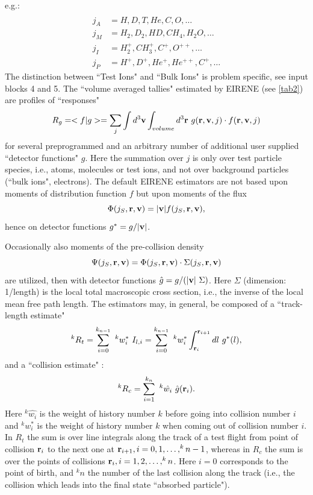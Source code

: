 e.g.:
\begin{align}
      &                                                  \\
  j_A & = H, D, T, He, C, O,  \dots \nonumber            \\
  j_M & = H_2, D_2,  HD, CH_4, H_2 O,  \dots \nonumber   \\
  j_I & = H_2^+, CH_3^+,  C^+, O^{++}, \dots  \nonumber  \\
  j_P & = H^+, D^+, He^+,  He^{++}, C^+, \dots \nonumber
\end{align}
The distinction between ``Test Ions" and ``Bulk Ions" is problem specific, see
input blocks 4 and 5.
The ``volume averaged tallies" estimated by EIRENE (see \cref{tab2}) are
profiles of ``responses"
\begin{displaymath}
  R_g = <	f | g	> = \sum_{j}
  \int d^3 \mathbf{v} \int_{volume} d^3 \mathbf{r} \ g(\mathbf{r}, \mathbf{v} , j)	 \cdot	   f(\mathbf{r}, \mathbf{v},
  j)\label{est}
\end{displaymath}
for several preprogrammed and an arbitrary
number of additional user supplied ``detector functions" $g$.
Here the summation over $j$ is only over test particle species, i.e., atoms,
molecules or test ions, and not over background particles (``bulk ions",
electrons).
The default EIRENE estimators are not based upon moments of distribution
function $f$ but upon moments of the flux
\begin{displaymath}
  \Phi ( j_S, \mathbf{r},
  \mathbf{v} ) = | \mathbf{v} |  f(j_S, \mathbf{r}, \mathbf{v}),
\end{displaymath}
hence on detector
functions $g^{*} = g / | \mathbf{v} | $.

Occasionally also moments of the pre-collision density
\begin{displaymath}
  \Psi
  ( j_S, \mathbf{r}, \mathbf{v} ) = \Phi ( j_S, \mathbf{r}, \mathbf{v} ) \cdot     \Sigma ( j_S, \mathbf{r}, \mathbf{v} )
\end{displaymath}
are utilized, then with detector functions $ \hat{g} = g / (|
  \mathbf{v} | \ \Sigma)  $.
Here $\Sigma$ (dimension: 1/length) is the local total macroscopic cross
section, i.e., the inverse of the local mean free path length.
The estimators may, in general, be composed of a ``track-length estimate"
\begin{equation}
  \label{tracklest} ^k{R_t} = \sum_{i=0}^{k_{n-1}}   \ ^k w_i^*
  \  I_{l,i} = \sum_{i=0}^{k_{n-1}} \ ^k w_i^* \int_{\mathbf{r}_i}^{\mathbf{r}_{i+1}}	dl \
  g^{*} (l),
\end{equation}
and a ``collision estimate" :
\begin{equation}
  \label{collest}
  ^k{R_c} = \sum_{i=1}^{k_n}   \ ^k{\hat{w_i}} \
  \hat{g}
  ( \mathbf{r}_i )	.
\end{equation}
Here $	^k{\hat{w_i}}$ is the weight of history number $k$ before going into
collision number $i$ and $ ^k{w_{i}^{*}}$ is the weight of history number $k$
when coming out of collision number $i$.
In $R_t$ the sum is over line integrals along the track of a test flight from
point of collision $ \mathbf{r}_i$ to the next one at $\mathbf{r}_{i+1}, i=0,1, \dots,
  ^k{n-1} $, whereas in $R_c$ the sum is over the points of collisions $\mathbf{r}_i,
  i=1,2, \dots, ^kn$.
Here $i=0$ corresponds to the point of birth, and $^kn$ the number of the last
collision along the track (i.e., the collision which leads into the final state
``absorbed particle").

